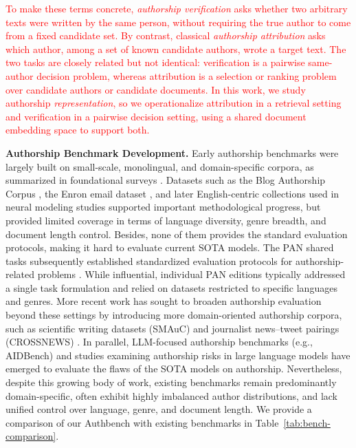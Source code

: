 \documentclass[11pt]{article}
\newcommand{\rev}[1]{\textcolor{red}{#1}}
\begin{document}
\rev{To make these terms concrete, \emph{authorship verification} asks whether two arbitrary texts were written by the same person, without requiring the true author to come from a fixed candidate set. By contrast, classical \emph{authorship attribution} asks which author, among a set of known candidate authors, wrote a target text. The two tasks are closely related but not identical: verification is a pairwise same-author decision problem, whereas attribution is a selection or ranking problem over candidate authors or candidate documents. In this work, we study authorship \emph{representation}, so we operationalize attribution in a retrieval setting and verification in a pairwise decision setting, using a shared document embedding space to support both.}

\textbf{Authorship Benchmark Development.}
\iffalse
Early authorship benchmarks were largely built on small-scale, monolingual, and domain-specific corpora, as summarized in foundational surveys \citep{stamatatos2009survey, neal2017surveying}. Datasets such as the Blog Authorship Corpus \citep{schler2006effects}, the Enron email dataset \citep{klimt2004enron}, and later English-centric collections used in neural modeling studies \citep{ruder2016character, jafariakinabad2019styleaware} supported important methodological progress, but provided limited coverage in terms of language diversity, genre breadth, and document length control.
Besides, none of them provides the standard evaluation protocols, making it hard to evaluate current SOTA models. The PAN shared tasks subsequently established standardized evaluation protocols for authorship-related problems \citep{bevendorff2020pan}. While influential, individual PAN editions typically addressed a single task formulation and relied on datasets restricted to specific languages and genres. More recent work has sought to broaden authorship evaluation beyond these settings by introducing more domain-oriented authorship corpora, such as scientific writing datasets (SMAuC) \citep{bevendorff2023smauc} and journalist news–tweet pairings (CROSSNEWS) \citep{ma2025crossnews}. In parallel, LLM-focused authorship benchmarks (e.g., AIDBench) \citep{wen2024aidbench} and studies examining authorship risks in large language models \citep{huang2024aa_llm, huang2024authorship} have emerged to evaluate the flaws of the SOTA models on authorship. Nevertheless, despite this growing body of work, existing benchmarks remain predominantly domain-specific, often exhibit highly imbalanced author distributions, and lack unified control over language, genre, and document length. We provide a comparison of our Authbench with existing benchmarks in Table~\ref{tab:bench-comparison}.
\end{document}
